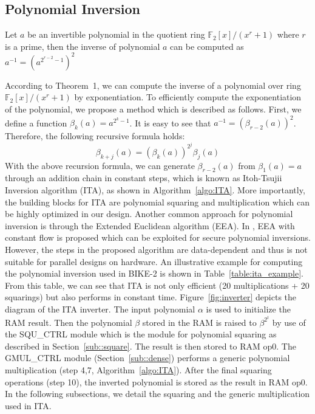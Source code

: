 \documentclass[runningheads]{llncs}
\begin{document}
\subsection{Polynomial Inversion}
\label{sub::inversion}
\begin{theorem}
Let $a$ be an invertible polynomial in the quotient ring $\mathbb{F}_2[x]/(x^r+1)$ where $r$ is a prime, then the inverse of polynomial $a$ can be computed as $a^{-1}=(a^{2^{r-2}-1})^2$
\end{theorem}
%
According to Theorem~1, we can compute the inverse of a
polynomial over ring $\mathbb{F}_2[x]/(x^r+1)$
by exponentiation.
To efficiently compute the exponentiation of the polynomial,
we propose a method which is described as follows.
First, we define a function $\beta_{k}(a)=a^{2^k-1}$.
It is easy to see that $a^{-1}=(\beta_{r-2}(a))^2$. %
Therefore, the following recursive
formula holds:
\[
    \beta_{k+j}(a)=(\beta_{k}(a))^{2^j}\beta_{j}(a)
\]
%
With the above recursion formula, we can generate $\beta_{r-2}(a)$ from $\beta_{1}(a)=a$
through an addition chain in constant steps, which is known as
Itoh-Tsujii Inversion algorithm (ITA), as shown in Algorithm~\ref{algo:ITA}.
More importantly, the building blocks for ITA are
polynomial squaring and multiplication which
can be highly optimized in our design.
Another common approach for polynomial inversion
is through the Extended Euclidean algorithm (EEA).
In \cite{georgieva2015toward}, EEA with constant flow is
proposed which can be exploited for secure polynomial inversions.
However, the steps in the proposed algorithm are data-dependent
and thus is not suitable for parallel designs on hardware.
An illustrative example for computing the polynomial inversion used in
BIKE-2 is shown in Table~\ref{table:ita_example}.
From this table, we can see that ITA is not only efficient
(20 multiplications + 20 squarings)
but also performs in constant time.
Figure~\ref{fig:inverter} depicts the diagram of the ITA inverter.
The input polynomial $\alpha$ is used to initialize the RAM result.
Then the polynomial $\beta$ stored in the RAM is raised
to ${\beta}^{2^t}$ by use of the SQU\_CTRL module which
is the module for polynomial squaring as described
in Section~\ref{sub::square}.
The result is then stored to RAM op0.
The GMUL\_CTRL module (Section~\ref{sub::dense}) performs a
generic polynomial multiplication
(step 4,7, Algorithm~\ref{algo:ITA}).
After the final squaring operations (step 10),
the inverted polynomial is stored as the result in RAM op0.
In the following subsections,
we detail the squaring and the generic multiplication used in ITA.
\end{document}

